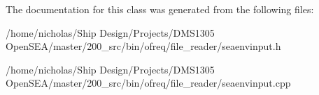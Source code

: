 The documentation for this class was generated from the following files\-:\begin{DoxyCompactItemize}
\item 
/home/nicholas/\-Ship Design/\-Projects/\-D\-M\-S1305 Open\-S\-E\-A/master/200\-\_\-src/bin/ofreq/file\-\_\-reader/seaenvinput.\-h\item 
/home/nicholas/\-Ship Design/\-Projects/\-D\-M\-S1305 Open\-S\-E\-A/master/200\-\_\-src/bin/ofreq/file\-\_\-reader/seaenvinput.\-cpp\end{DoxyCompactItemize}
